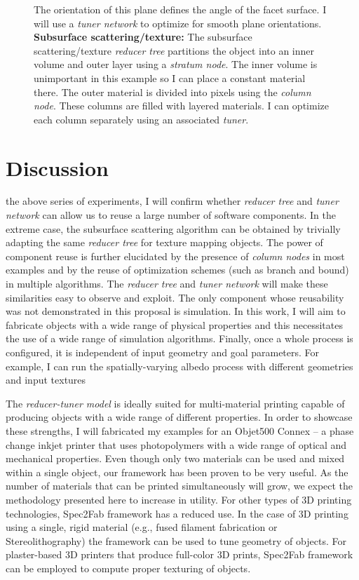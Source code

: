 \begin{figure}[t]
{The orientation of this plane defines the angle of the facet surface. 
I will use a \emph{tuner network} to optimize for smooth plane orientations.
\textbf{Subsurface scattering/texture:} The subsurface scattering/texture \emph{reducer tree} partitions the object into an inner volume and outer layer using a \emph{stratum node}.
The inner volume is unimportant in this example so I  can place a constant material there.
The outer material is divided into pixels using the \emph{column node}.
These columns are filled with layered materials.
I can optimize each column separately using an associated \emph{tuner}.}
\label{fig:ReducerTreesAdditional}
\end{figure}
\chapter{Discussion}
 the above series of experiments, I will confirm whether \emph{reducer tree} and \emph{tuner network} can allow us to reuse a large number of software components.
In the extreme case, the subsurface scattering algorithm can be obtained by trivially adapting the same \emph{reducer tree} for texture mapping objects.
The power of component reuse is further elucidated by the presence of \emph{column nodes} in most examples and by the reuse of optimization schemes (such as branch and bound) in multiple algorithms.
The \emph{reducer tree} and \emph{tuner network} will make these similarities easy to observe and exploit.
The only component whose reusability was not demonstrated in this proposal is simulation.
In this work, I will aim to fabricate objects with a wide range of physical properties and this necessitates the use of a wide range of simulation algorithms. Finally, once a whole process is configured, it is independent of input geometry and goal parameters. For example, I can run the spatially-varying albedo process with different geometries and input textures

The \emph{reducer-tuner model} is ideally suited for multi-material printing capable of producing objects with a wide range of different properties.
In order to showcase these strengths, I will fabricated my examples for an Objet500 Connex -- a phase change inkjet printer that uses photopolymers with a wide range of optical and mechanical properties. Even though only two materials can be used and mixed within a single object, our framework has been proven to be very useful. 
As the number of materials that can be printed simultaneously will grow, we expect the methodology presented here to increase in utility.
For other types of 3D printing technologies, Spec2Fab framework has a reduced use. In the case of 3D printing using a single, rigid material (e.g., fused filament fabrication or Stereolithography) the framework can be used to tune geometry of objects. For plaster-based 3D printers that produce full-color 3D prints, Spec2Fab framework can be employed to compute proper texturing of objects.
